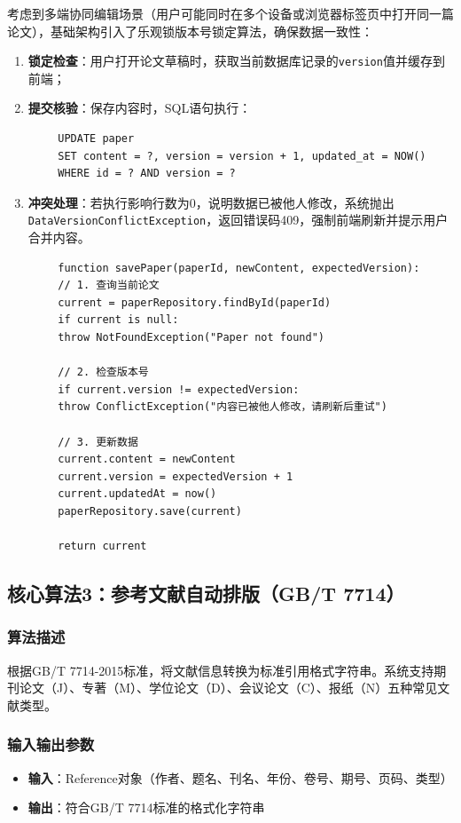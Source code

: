\documentclass{../template/softeng}
\begin{document}
	考虑到多端协同编辑场景（用户可能同时在多个设备或浏览器标签页中打开同一篇论文），基础架构引入了乐观锁版本号锁定算法，确保数据一致性：

	\begin{enumerate}
		\item \textbf{锁定检查}：用户打开论文草稿时，获取当前数据库记录的\texttt{version}值并缓存到前端；
		\item \textbf{提交核验}：保存内容时，SQL语句执行：
	\end{enumerate}
	\begin{verbatim}
		UPDATE paper
		SET content = ?, version = version + 1, updated_at = NOW()
		WHERE id = ? AND version = ?
	\end{verbatim}
	\begin{enumerate}
		\setcounter{enumi}{2}
		\item \textbf{冲突处理}：若执行影响行数为0，说明数据已被他人修改，系统抛出\texttt{DataVersionConflictException}，返回错误码409，强制前端刷新并提示用户合并内容。
	\end{enumerate}

	\begin{verbatim}
		function savePaper(paperId, newContent, expectedVersion):
		// 1. 查询当前论文
		current = paperRepository.findById(paperId)
		if current is null:
		throw NotFoundException("Paper not found")

		// 2. 检查版本号
		if current.version != expectedVersion:
		throw ConflictException("内容已被他人修改，请刷新后重试")

		// 3. 更新数据
		current.content = newContent
		current.version = expectedVersion + 1
		current.updatedAt = now()
		paperRepository.save(current)

		return current
	\end{verbatim}

	\subsection{核心算法3：参考文献自动排版（GB/T 7714）}

	\subsubsection{算法描述}
	根据GB/T 7714-2015标准，将文献信息转换为标准引用格式字符串。系统支持期刊论文（J）、专著（M）、学位论文（D）、会议论文（C）、报纸（N）五种常见文献类型。

	\subsubsection{输入输出参数}
	\begin{itemize}
		\item \textbf{输入}：Reference对象（作者、题名、刊名、年份、卷号、期号、页码、类型）
		\item \textbf{输出}：符合GB/T 7714标准的格式化字符串
	\end{itemize}
\end{document}

